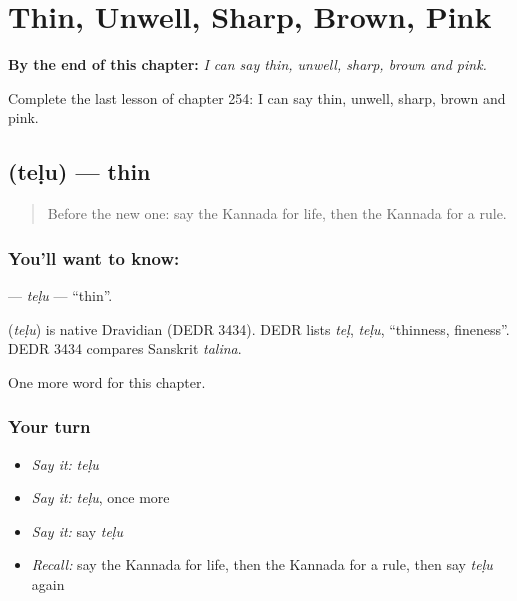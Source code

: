 
\chapter{Thin, Unwell, Sharp, Brown, Pink}
\label{ch:ka-thin-unwell-sharp-brown-pink}

\begin{chapteropening}
\textbf{By the end of this chapter:} \emph{I can say thin, unwell, sharp, brown and pink.}

Complete the last lesson of chapter 254: I can say thin, unwell, sharp, brown and pink.
\end{chapteropening}

\section[\texorpdfstring{\kn{ತೆಳು} (teḷu)}{ತೆಳು (teḷu)}]{ (teḷu) — thin}

\label{lesson:KA-C254-telu2}



\begin{quote}
Before the new one: say the Kannada for life, then the Kannada for a rule.
\end{quote}

\subsection*{You'll want to know: }
\textbf{} — \emph{teḷu} — \textquotedblleft{}thin\textquotedblright{}.

\begin{cousinweb}
\textbf{} (\emph{teḷu}) is native Dravidian (DEDR 3434). DEDR lists \emph{teḷ}, \emph{teḷu}, \textquotedblleft{}thinness, fineness\textquotedblright{}. DEDR 3434 compares Sanskrit \emph{talina}.
\end{cousinweb}

\begin{grammarlens}[title={What you've built}]
One more word for this chapter.
\end{grammarlens}

\subsection*{Your turn}
\begin{itemize}
\raggedright
  \item \emph{Say it:} \emph{teḷu}
  \item \emph{Say it:} \emph{teḷu}, once more
  \item \emph{Say it:} say \emph{teḷu}
  \item \emph{Recall:} say the Kannada for life, then the Kannada for a rule, then say \emph{teḷu} again
\end{itemize}

